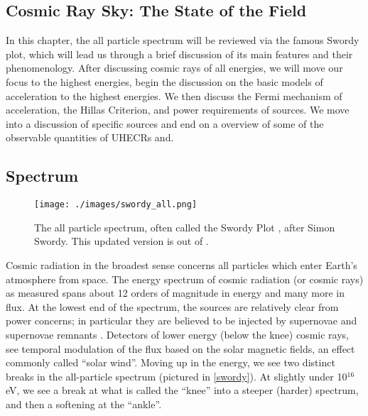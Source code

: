 \begin{singlespace}
\chapter{Cosmic Ray Sky: The State of the Field}
\end{singlespace}
In this chapter, the all particle spectrum will be reviewed via the famous Swordy plot, which will lead us through a brief discussion of its main features and their phenomenology. After discussing cosmic rays of all energies, we will move our focus to the highest energies, begin the discussion on the basic models of acceleration to the highest energies. We then discuss the Fermi mechanism of acceleration, the Hillas Criterion, and power requirements of sources. We move into a discussion of specific sources and end on a overview of some of the observable quantities of UHECRs and. 

\section{Spectrum}

\begin{figure}
\begin{center}
\texttt{[image: ./images/swordy\_all.png]}
\begin{singlespace}
\caption[All Particle Spectrum (Swordy Plot)]{The all particle spectrum, often called the Swordy Plot \cite{realsswordy}, after Simon Swordy. This updated version is out of .}
\end{singlespace}
\label{swordy}
\end{center}
\end{figure}


Cosmic radiation in the broadest sense concerns all particles which enter Earth's atmosphere from space. The energy spectrum of cosmic radiation (or cosmic rays)  as measured spans about 12 orders of magnitude in energy and many more in flux. At the lowest end of the spectrum, the sources are relatively clear from power concerns; in particular they are believed to be injected by supernovae and supernovae remnants \cite{stanev}. Detectors of lower energy (below the knee) cosmic rays, see temporal modulation of the flux based on the solar magnetic fields, an effect commonly called ``solar wind''. Moving up in the energy, we see two distinct breaks in the all-particle spectrum (pictured in \autoref{swordy}). At slightly under 10$^{16}$eV, we see a break at what is called the ``knee'' into a steeper (harder) spectrum, and then a softening at the ``ankle''. 

